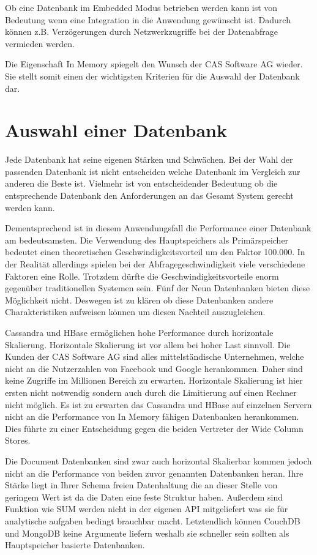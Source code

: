 Ob eine Datenbank im Embedded Modus betrieben werden kann ist von Bedeutung wenn eine Integration in die Anwendung gewünscht ist. Dadurch können z.B. Verzögerungen durch Netzwerkzugriffe bei der Datenabfrage vermieden werden. 

Die Eigenschaft In Memory spiegelt den Wunsch der CAS Software AG wieder. Sie stellt somit einen der wichtigsten Kriterien für die Auswahl der Datenbank dar.

\section{Auswahl einer Datenbank}
\label{ch:AnalyseDatenbanken:sec:Ergebniss}

Jede Datenbank hat seine eigenen Stärken und Schwächen. Bei der Wahl der passenden Datenbank ist nicht entscheiden welche Datenbank im Vergleich zur anderen die Beste ist. Vielmehr ist von entscheidender Bedeutung ob die entsprechende Datenbank den Anforderungen an das Gesamt System gerecht werden kann. 

Dementsprechend ist in diesem Anwendungsfall die Performance einer Datenbank am bedeutsamsten. Die Verwendung des Hauptspeichers als Primärspeicher bedeutet einen theoretischen Geschwindigkeitsvorteil um den Faktor 100.000.
In der Realität allerdings spielen bei der Abfragegeschwindigkeit viele verschiedene Faktoren eine Rolle. Trotzdem dürfte die Geschwindigkeitsvorteile enorm gegenüber traditionellen Systemen sein. Fünf der Neun Datenbanken bieten diese Möglichkeit nicht. Deswegen ist zu klären ob diese Datenbanken andere Charakteristiken aufweisen können um diesen Nachteil auszugleichen.

Cassandra und HBase ermöglichen hohe Performance durch horizontale Skalierung. Horizontale Skalierung ist vor allem bei hoher Last sinnvoll. Die Kunden der CAS Software AG sind alles mittelständische Unternehmen, welche nicht an die Nutzerzahlen von Facebook und Google herankommen. Daher sind keine Zugriffe im Millionen Bereich zu erwarten. Horizontale Skalierung ist hier ersten nicht notwendig sondern auch durch die Limitierung auf einen Rechner nicht möglich. Es ist zu erwarten das Cassandra und HBase auf einzelnen Servern nicht an die Performance von In Memory fähigen Datenbanken herankommen. Dies führte zu einer Entscheidung gegen die beiden Vertreter der Wide Column Stores.

Die Document Datenbanken sind zwar auch horizontal Skalierbar kommen jedoch nicht an die Performance von beiden zuvor genannten Datenbanken heran. Ihre Stärke liegt in Ihrer Schema freien Datenhaltung die an dieser Stelle von geringem Wert ist da die Daten eine feste Struktur haben. Außerdem sind Funktion wie SUM werden nicht in der eigenen API mitgeliefert was sie für analytische aufgaben bedingt brauchbar macht. Letztendlich können CouchDB und MongoDB keine Argumente liefern weshalb sie schneller sein sollten als Hauptspeicher basierte Datenbanken.

